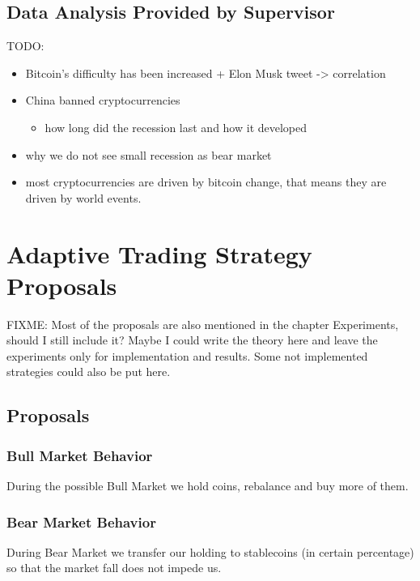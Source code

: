 \section{Data Analysis Provided by Supervisor}

TODO:

\begin{itemize}
    \item Bitcoin's difficulty has been increased + Elon Musk tweet -> correlation
    \item China banned cryptocurrencies
    \begin{itemize}
        \item how long did the recession last and how it developed
    \end{itemize}
    \item why we do not see small recession as bear market
    \item most cryptocurrencies are driven by bitcoin change, that means they are driven by world events.
\end{itemize}

\chapter{Adaptive Trading Strategy Proposals}
FIXME: Most of the proposals are also mentioned in the chapter Experiments, should I still include it? Maybe I could write the theory here and leave the experiments only for implementation and results. Some not implemented strategies could also be put here.

\label{chapter-strategy-proposals}

\section{Proposals}

\subsection*{Bull Market Behavior}
During the possible Bull Market we hold coins, rebalance and buy more of them.

\subsection*{Bear Market Behavior}
During Bear Market we transfer our holding to stablecoins (in certain percentage) so that the market fall does not impede us.

